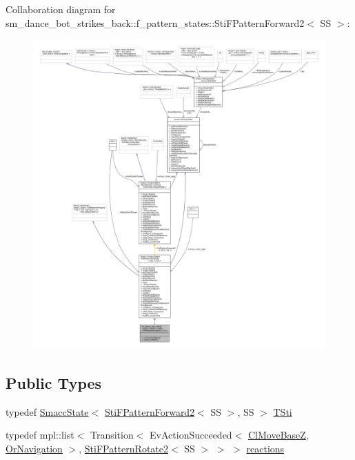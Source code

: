 Collaboration diagram for sm\+\_\+dance\+\_\+bot\+\_\+strikes\+\_\+back\+:\+:f\+\_\+pattern\+\_\+states\+:\+:Sti\+F\+Pattern\+Forward2$<$ SS $>$\+:
\nopagebreak
\begin{figure}[H]
\begin{center}
\leavevmode
\includegraphics[width=350pt]{structsm__dance__bot__strikes__back_1_1f__pattern__states_1_1StiFPatternForward2__coll__graph}
\end{center}
\end{figure}
\subsection*{Public Types}
\begin{DoxyCompactItemize}
\item 
typedef \hyperlink{classSmaccState}{Smacc\+State}$<$ \hyperlink{structsm__dance__bot__strikes__back_1_1f__pattern__states_1_1StiFPatternForward2}{Sti\+F\+Pattern\+Forward2}$<$ SS $>$, SS $>$ \hyperlink{structsm__dance__bot__strikes__back_1_1f__pattern__states_1_1StiFPatternForward2_a2476b4df7abc75dd9bb750a71a9df158}{T\+Sti}
\item 
typedef mpl\+::list$<$ Transition$<$ Ev\+Action\+Succeeded$<$ \hyperlink{classmove__base__z__client_1_1ClMoveBaseZ}{Cl\+Move\+BaseZ}, \hyperlink{classsm__dance__bot__strikes__back_1_1OrNavigation}{Or\+Navigation} $>$, \hyperlink{structsm__dance__bot__strikes__back_1_1f__pattern__states_1_1StiFPatternRotate2}{Sti\+F\+Pattern\+Rotate2}$<$ SS $>$ $>$ $>$ \hyperlink{structsm__dance__bot__strikes__back_1_1f__pattern__states_1_1StiFPatternForward2_a4b666bddbb8b37f7bb03616092defb3e}{reactions}
\end{DoxyCompactItemize}
